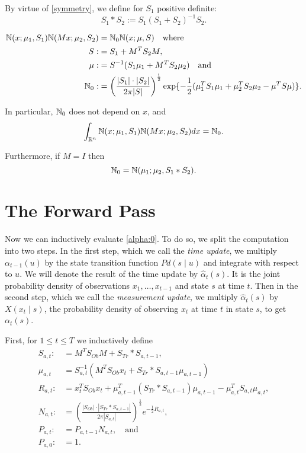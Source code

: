 \documentclass[12pt,leqno]{article}
\begin{document}
By virtue of \eqref{symmetry}, we define for $S_1$ positive definite:
$$
S_1*S_2 := S_1(S_1+S_2)^{-1}S_2.
$$

\begin{Cor}\label{comp_sq:2}
\begin{align*}
  {\mathbb N}(x;\mu_1,S_1){\mathbb N}(Mx;\mu_2,S_2) &= {\mathbb N}_0{\mathbb N}(x;\mu,S)\quad\text{where}\\
  S :&= S_1+M^TS_2M,\\
  \mu :&= S^{-1}(S_1\mu_1 + M^TS_2\mu_2)\quad\text{and} \\
  {\mathbb N}_0 :&= \left(\frac{|S_1|\cdot|S_2|}{2\pi|S|}\right)^{\frac{1}{2}}\exp\{-\frac{1}{2}(\mu_1^TS_1\mu_1 + \mu_2^TS_2\mu_2-\mu^TS\mu)\}.
\end{align*}

In particular, ${\mathbb N}_0$ does not depend on $x$, and
\begin{equation}\label{comp_sq:int}
  \int_{{\mathbb R}^{n}}  {\mathbb N}(x;\mu_1,S_1){\mathbb N}(Mx;\mu_2,S_2)dx = {\mathbb N}_0.
\end{equation}

Furthermore, if $M = I$ then 
\begin{equation}\label{exact_prod} 
  {\mathbb N}_0 = {\mathbb N}(\mu_1;\mu_2,S_1*S_2).
\end{equation}
\end{Cor}

\section{The Forward Pass}
  Now we can inductively evaluate \eqref{alpha:0}. To do so, we split the computation
  into two steps.  In the first step, which we call the {\em time update}, we multiply
  $\alpha_{t-1}(u)$ by the state transition function $Pd(s\mid u)$ and integrate with respect
  to $u$. We will denote the result of the time update by $\hat{\alpha}_t(s)$.  It is the joint probability
  density of observations $x_1,\dots,x_{t-1}$ and state $s$ at time $t$.
  Then in the second step, which we call the {\em measurement update}, we multiply
  $\hat{\alpha}_t(s)$ by $X(x_t \mid s)$, the probability density of observing $x_t$ at time $t$
  in state $s$, to get $\alpha_t(s)$.

  First, for $1\le t \le T$ we inductively define
\begin{align*}
  S_{a,t} :&= M^TS_{Ob}M + S_{Tr}*S_{a,t-1},\\
  \mu_{a,t} &= S_{a,t}^{-1}(M^TS_{Ob}x_t + S_{Tr}*S_{a,t-1}\mu_{a,t-1})\\
  R_{a,t} :&= x_t^TS_{Ob}x_t + \mu_{a,t-1}^T(S_{Tr}*S_{a,t-1})\mu_{a,t-1} - \mu_{a,t}^TS_{a,t}\mu_{a,t},\\
  N_{a,t} :&= \left(\frac{|S_{Ob}|\cdot|S_{Tr}*S_{a,t-1}|}{2\pi|S_{a,t}|}\right)^{\frac{1}{2}}e^{-\frac{1}{2}R_{a,t}},\\
  P_{a,t} :&= P_{a,t-1}N_{a,t}, \quad\text{and}\\
  P_{a,0} :&= 1.
\end{align*}
\end{document}
